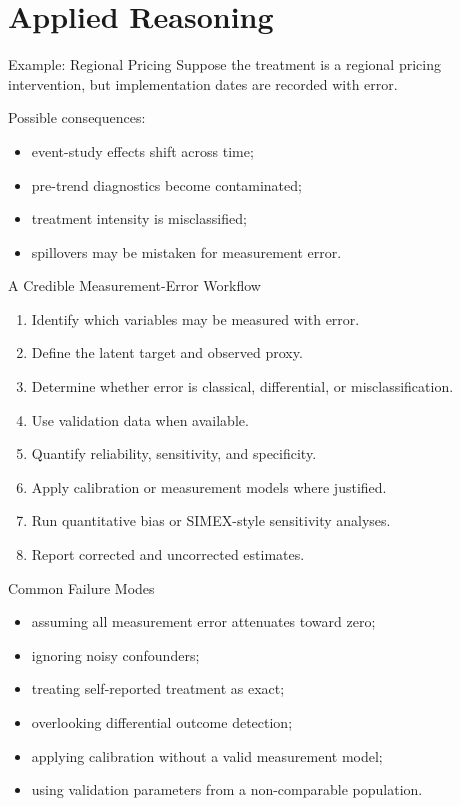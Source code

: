 \documentclass[aspectratio=169,11pt]{beamer}
\begin{document}
\section{Applied Reasoning}

\begin{frame}{Example: Regional Pricing}
Suppose the treatment is a regional pricing intervention, but implementation dates are recorded with error.

Possible consequences:
\begin{itemize}
\item event-study effects shift across time;
\item pre-trend diagnostics become contaminated;
\item treatment intensity is misclassified;
\item spillovers may be mistaken for measurement error.
\end{itemize}
\end{frame}

\begin{frame}{A Credible Measurement-Error Workflow}
\begin{enumerate}
\item Identify which variables may be measured with error.
\item Define the latent target and observed proxy.
\item Determine whether error is classical, differential, or misclassification.
\item Use validation data when available.
\item Quantify reliability, sensitivity, and specificity.
\item Apply calibration or measurement models where justified.
\item Run quantitative bias or SIMEX-style sensitivity analyses.
\item Report corrected and uncorrected estimates.
\end{enumerate}
\end{frame}

\begin{frame}{Common Failure Modes}
\begin{itemize}
\item assuming all measurement error attenuates toward zero;
\item ignoring noisy confounders;
\item treating self-reported treatment as exact;
\item overlooking differential outcome detection;
\item applying calibration without a valid measurement model;
\item using validation parameters from a non-comparable population.
\end{itemize}
\end{frame}
\end{document}
